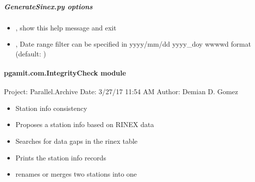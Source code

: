 \documentclass[letterpaper,10pt,english]{sphinxmanual}
\begin{document}
\subparagraph{GenerateSinex.py options}
\label{\detokenize{pgamit.com:GenerateSinex.py-options}}\begin{itemize}
\item {} 
\sphinxAtStartPar
{\hyperref[\detokenize{pgamit.com:GenerateSinex.py--h}]{}}, {\hyperref[\detokenize{pgamit.com:GenerateSinex.py---help}]{}} \sphinxhyphen{} show this help message and exit

\item {} 
\sphinxAtStartPar
{\hyperref[\detokenize{pgamit.com:GenerateSinex.py--d}]{}} , {\hyperref[\detokenize{pgamit.com:GenerateSinex.py---date_filter}]{}}  \sphinxhyphen{} Date range filter can be specified in yyyy/mm/dd yyyy\_doy  wwww\sphinxhyphen{}d format (default: )

\end{itemize}


\paragraph{pgamit.com.IntegrityCheck module}
\label{\detokenize{pgamit.com:module-pgamit.com.IntegrityCheck}}\label{\detokenize{pgamit.com:pgamit-com-integritycheck-module}}
\sphinxAtStartPar
Project: Parallel.Archive
Date: 3/27/17 11:54 AM
Author: Demian D. Gomez
\begin{description}
\begin{itemize}
\item {} 
\sphinxAtStartPar
Station info consistency

\item {} 
\sphinxAtStartPar
Proposes a station info based on RINEX data

\item {} 
\sphinxAtStartPar
Searches for data gaps in the rinex table

\item {} 
\sphinxAtStartPar
Prints the station info records

\item {} 
\sphinxAtStartPar
renames or merges two stations into one

\end{itemize}

\end{description}
\end{document}
